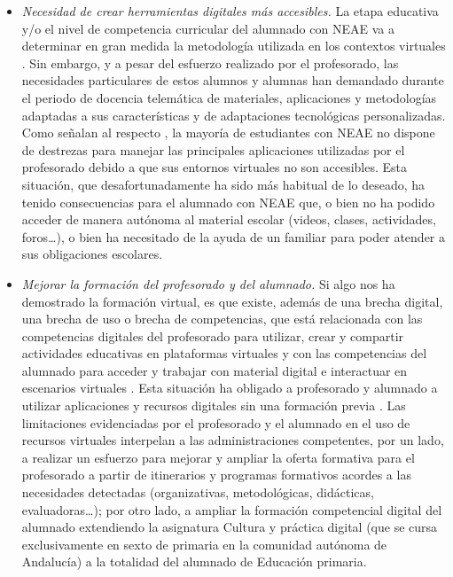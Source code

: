 \documentclass{textolivre}
\begin{document}
\begin{itemize}
    \item \emph{Necesidad de crear herramientas digitales más accesibles.} 
    La etapa educativa y/o el nivel de competencia curricular del alumnado con NEAE va a determinar en gran medida la metodología utilizada en los contextos virtuales \cite{menendez2020}. %
    Sin embargo, y a pesar del esfuerzo realizado por el profesorado, las necesidades particulares de estos alumnos y alumnas han demandado durante el periodo de docencia telemática de materiales, aplicaciones y metodologías adaptadas a sus características y de adaptaciones tecnológicas personalizadas. Como señalan al respecto \textcite{vega2020}, %
    la mayoría de estudiantes con NEAE no dispone de destrezas para manejar las principales aplicaciones utilizadas por el profesorado debido a que sus entornos virtuales no son accesibles. Esta situación, que desafortunadamente ha sido más habitual de lo deseado, ha tenido consecuencias para el alumnado con NEAE que, o bien no ha podido acceder de manera autónoma al material escolar (videos, clases, actividades, foros…), o bien ha necesitado de la ayuda de un familiar para poder atender a sus obligaciones escolares. 
    
    \item \emph{Mejorar la formación del profesorado y del alumnado.} 
    Si algo nos ha demostrado la formación virtual, es que existe, además de una brecha digital, una brecha de uso \cite{fernandezenguita2020} %
    o brecha de competencias, que está relacionada con las competencias digitales del profesorado para utilizar, crear y compartir actividades educativas en plataformas virtuales y con las competencias del alumnado para acceder y trabajar con material digital e interactuar en escenarios virtuales \cite{garciapenalvo2020}. %
    Esta situación ha obligado a profesorado y alumnado a utilizar aplicaciones y recursos digitales sin una formación previa \cite{rogero2020}. %
    Las limitaciones evidenciadas por el profesorado y el alumnado en el uso de recursos virtuales interpelan a las administraciones competentes, por un lado, a realizar un esfuerzo para mejorar y ampliar la oferta formativa para el profesorado a partir de itinerarios y programas formativos acordes a las necesidades detectadas (organizativas, metodológicas, didácticas, evaluadoras…); por otro lado, a ampliar la formación competencial digital del alumnado extendiendo la asignatura Cultura y práctica digital (que se cursa exclusivamente en sexto de primaria en la comunidad autónoma de Andalucía) a la totalidad del alumnado de Educación primaria.
\end{itemize}
\end{document}
